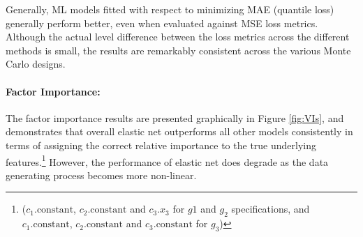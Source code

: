 \documentclass{article}
\begin{document}
Generally, ML models fitted with respect to minimizing MAE (quantile loss) generally perform better, even when evaluated against MSE loss metrics. Although the actual level difference between the loss metrics across the different methods is small, the results are remarkably consistent across the various Monte Carlo designs. 




\paragraph{Factor Importance:}
The factor importance results are presented graphically in Figure \ref{fig:VIs}, and demonstrates that overall elastic net outperforms all other models consistently in terms of assigning the correct relative importance to the true underlying features.\footnote{($c_1.\text{constant}$, $c_2.\text{constant}$ and $c_3.x_3$ for $g1$ and $g_2$ specifications, and $c_1.\text{constant}$, $c_2.\text{constant}$ and $c_3.\text{constant}$ for $g_3$)} However, the performance of elastic net does degrade as the data generating process becomes more non-linear.%
\end{document}
